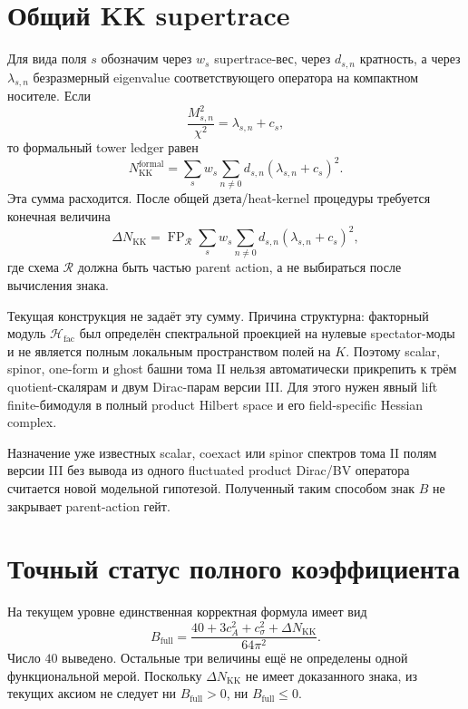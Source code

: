 \section{Общий KK supertrace}

Для вида поля \(s\) обозначим через \(w_s\) supertrace-вес, через
\(d_{s,n}\) кратность, а через \(\lambda_{s,n}\) безразмерный eigenvalue
соответствующего оператора на компактном носителе. Если
\begin{equation}
 \frac{M_{s,n}^2}{\chi^2}=\lambda_{s,n}+c_s,
\end{equation}
то формальный tower ledger равен
\begin{equation}
 N_{\mathrm{KK}}^{\mathrm{formal}}
 =\sum_s w_s\sum_{n\ne0}d_{s,n}
   (\lambda_{s,n}+c_s)^2.
\end{equation}
Эта сумма расходится. После общей дзета/heat-kernel процедуры требуется
конечная величина
\begin{equation}
 \Delta N_{\mathrm{KK}}
 =\operatorname{FP}_{\mathcal R}
 \sum_s w_s\sum_{n\ne0}d_{s,n}
   (\lambda_{s,n}+c_s)^2,
\end{equation}
где схема \(\mathcal R\) должна быть частью parent action, а не выбираться
после вычисления знака.

Текущая конструкция не задаёт эту сумму. Причина структурна: факторный
модуль \(\mathcal H_{\mathrm{fac}}\) был определён спектральной проекцией на
нулевые spectator-моды и не является полным локальным пространством полей
на \(K\). Поэтому scalar, spinor, one-form и ghost башни тома II нельзя
автоматически прикрепить к трём quotient-скалярам и двум Dirac-парам
версии III. Для этого нужен явный lift finite-бимодуля в полный product
Hilbert space и его field-specific Hessian complex.

\begin{nogocriterion}
Назначение уже известных scalar, coexact или spinor спектров тома II
полям версии III без вывода из одного fluctuated product Dirac/BV
оператора считается новой модельной гипотезой. Полученный таким способом
знак \(B\) не закрывает parent-action гейт.
\end{nogocriterion}

\section{Точный статус полного коэффициента}

На текущем уровне единственная корректная формула имеет вид
\begin{equation}
 \boxed{
 B_{\mathrm{full}}
 =\frac{40+3c_A^2+c_\sigma^2+\Delta N_{\mathrm{KK}}}
 {64\pi^2}.}
\end{equation}
Число \(40\) выведено. Остальные три величины ещё не определены одной
функциональной мерой. Поскольку \(\Delta N_{\mathrm{KK}}\) не имеет
доказанного знака, из текущих аксиом не следует ни
\(B_{\mathrm{full}}>0\), ни \(B_{\mathrm{full}}\leq0\).

